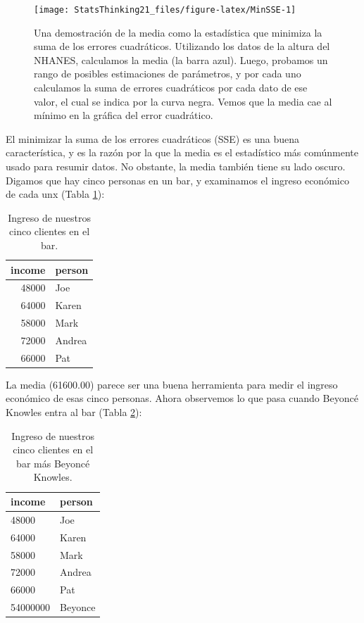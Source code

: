 \documentclass[
  12pt,
]{book}
\begin{document}
\begin{figure}
\texttt{[image: StatsThinking21\_files/figure-latex/MinSSE-1]} \caption{Una demostración de la media como la estadística que minimiza la suma de los errores cuadráticos. Utilizando los datos de la altura del NHANES, calculamos la media (la barra azul). Luego, probamos un rango de posibles estimaciones de parámetros, y por cada uno calculamos la suma de errores cuadráticos por cada dato de ese valor, el cual se indica por la curva negra. Vemos que la media cae al mínimo en la gráfica del error cuadrático.}\label{fig:MinSSE}
\end{figure}

El minimizar la suma de los errores cuadráticos (SSE) es una buena característica, y es la razón por la que la media es el estadístico más comúnmente usado para resumir datos. No obstante, la media también tiene su lado oscuro. Digamos que hay cinco personas en un bar, y examinamos el ingreso económico de cada unx (Tabla \ref{tab:income1}):

\begin{table}

\caption{\label{tab:income1}Ingreso de nuestros cinco clientes en el bar.}
\centering
\begin{tabular}[t]{r|l}
\hline
income & person\\
\hline
48000 & Joe\\
\hline
64000 & Karen\\
\hline
58000 & Mark\\
\hline
72000 & Andrea\\
\hline
66000 & Pat\\
\hline
\end{tabular}
\end{table}

La media (61600.00) parece ser una buena herramienta para medir el ingreso económico de esas cinco personas. Ahora observemos lo que pasa cuando Beyoncé Knowles entra al bar (Tabla \ref{tab:income2}):

\begin{table}

\caption{\label{tab:income2}Ingreso de nuestros cinco clientes en el bar más Beyoncé Knowles.}
\centering
\begin{tabular}[t]{l|l}
\hline
income & person\\
\hline
48000 & Joe\\
\hline
64000 & Karen\\
\hline
58000 & Mark\\
\hline
72000 & Andrea\\
\hline
66000 & Pat\\
\hline
54000000 & Beyonce\\
\hline
\end{tabular}
\end{table}
\end{document}
